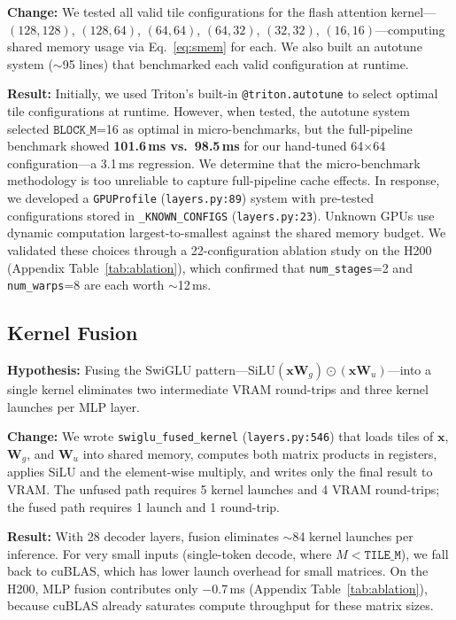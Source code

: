 \documentclass{article}
\begin{document}
\textbf{Change:} We tested all valid tile configurations for the flash attention kernel---$(128,128)$, $(128,64)$, $(64,64)$, $(64,32)$, $(32,32)$, $(16,16)$---computing shared memory usage via Eq.~\ref{eq:smem} for each.  We also built an autotune system ($\sim$95 lines) that benchmarked each valid configuration at runtime.

\textbf{Result:} Initially, we used Triton's built-in \texttt{@triton.autotune} to select optimal tile configurations at runtime.  However, when tested, the autotune system selected $\texttt{BLOCK\_M}$=16 as optimal in micro-benchmarks, but the full-pipeline benchmark showed \textbf{101.6\,ms vs.\ 98.5\,ms} for our hand-tuned 64$\times$64 configuration---a 3.1\,ms regression.  We determine that the micro-benchmark methodology is too unreliable to capture full-pipeline cache effects.
In response, we developed a \texttt{GPUProfile} (\texttt{layers.py:89}) system with pre-tested configurations stored in \texttt{\_KNOWN\_CONFIGS} (\texttt{layers.py:23}). Unknown GPUs use dynamic computation largest-to-smallest against the shared memory budget.
We validated these choices through a 22-configuration ablation study on the H200 (Appendix Table~\ref{tab:ablation}), which confirmed that \texttt{num\_stages}=2 and \texttt{num\_warps}=8 are each worth $\sim$12\,ms.

\subsection{Kernel Fusion}\label{sec:fusion}

\textbf{Hypothesis:} Fusing the SwiGLU pattern---$\text{SiLU}(\mathbf{x} \mathbf{W}_g) \odot (\mathbf{x} \mathbf{W}_u)$---into a single kernel eliminates two intermediate VRAM round-trips and three kernel launches per MLP layer.

\textbf{Change:} We wrote \texttt{swiglu\_fused\_kernel} (\texttt{layers.py:546}) that loads tiles of $\mathbf{x}$, $\mathbf{W}_g$, and $\mathbf{W}_u$ into shared memory, computes both matrix products in registers, applies SiLU and the element-wise multiply, and writes only the final result to VRAM.  The unfused path requires 5 kernel launches and 4 VRAM round-trips; the fused path requires 1 launch and 1 round-trip.

\textbf{Result:} With 28 decoder layers, fusion eliminates $\sim$84 kernel launches per inference.  For very small inputs (single-token decode, where $M < \texttt{TILE\_M}$), we fall back to cuBLAS, which has lower launch overhead for small matrices.  On the H200, MLP fusion contributes only $-$0.7\,ms (Appendix Table~\ref{tab:ablation}), because cuBLAS already saturates compute throughput for these matrix sizes.
\end{document}

